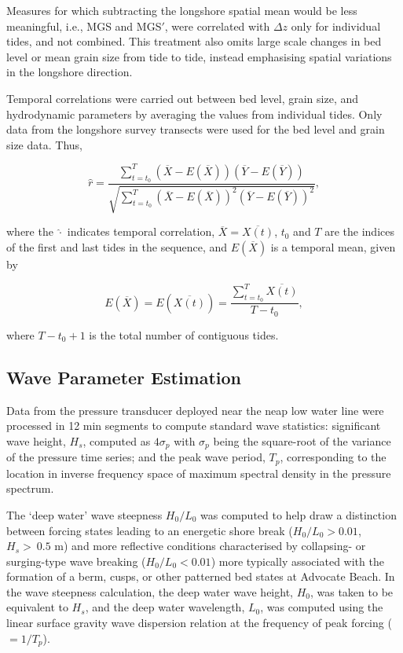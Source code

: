 \documentclass[preprint,12pt,authoryear]{elsarticle}
\begin{document}
Measures for which subtracting the longshore spatial mean would be less meaningful, i.e., MGS and MGS$'$, were correlated with $\Delta z$ only for individual tides, and not combined. This treatment also omits large scale changes in bed level or mean grain size from tide to tide, instead emphasising spatial variations in the longshore direction.

Temporal correlations were carried out between bed level, grain size, and hydrodynamic parameters by averaging the values from individual tides. Only data from the longshore survey transects were used for the bed level and grain size data. Thus,

\begin{equation}\label{eq:pearsons_r_time}
\hat{r} = \frac{\sum_{t=t_0}^{T}(\overline{X} - E(\overline{X}))(\overline{Y}-E(\overline{Y}))}{\sqrt{\sum_{t=t_0}^{T}(\overline{X}-E(\overline{X}))^2 (\overline{Y}-E(\overline{Y}))^2}},
\end{equation}

\noindent where the $\hat{\cdot}$ indicates temporal correlation, $\overline{X}=\overline{X(t)}$, $t_0$ and $T$ are the indices of the first and last tides in the sequence, and $E(\overline{X})$ is a temporal mean, given by

\begin{equation}\label{eq:time_mean}
E(\overline{X}) = E(\overline{X(t)}) = \frac{\sum_{t=t_0}^{T} \overline{X(t)}}{T-t_0},
\end{equation}

\noindent where $T-t_0+1$ is the total number of contiguous tides.


\subsection{Wave Parameter Estimation}\label{Methods:Wavedata}

Data from the pressure transducer deployed near the neap low water line were processed in 12 min segments to compute standard wave statistics: significant wave height, $H_s$, computed as $4\sigma_p$ with $\sigma_p$ being the square-root of the variance of the pressure time series; and the peak wave period, $T_p$, corresponding to the location in inverse frequency space of maximum spectral density in the pressure spectrum. %

The `deep water' wave steepness $H_0/L_0$ was computed to help draw a distinction between forcing states leading to an energetic shore break ($H_0/L_0 > 0.01$, $H_s > ~0.5$ m) and more reflective conditions characterised by collapsing- or surging-type wave breaking ($H_0/L_0 < 0.01$) more typically associated with the formation of a berm, cusps, or other patterned bed states at Advocate Beach. In the wave steepness calculation, the deep water wave height, $H_0$, was taken to be equivalent to $H_s$, and the deep water wavelength, $L_0$, was computed using the linear surface gravity wave dispersion relation at the frequency of peak forcing ($=1/T_p$).
\end{document}
